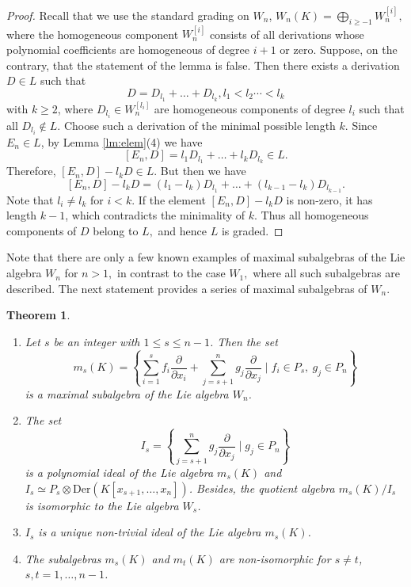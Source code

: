 \documentclass[12pt,a4paper]{amsart}
\theoremstyle{plain}
\newtheorem{theorem}{Theorem}
\theoremstyle{definition}
\begin{document}
\begin{proof}
	Recall that we use the  standard grading on $W_n$, $W_n(K) = \bigoplus_{i \ge -1} W_n^{[i]},$ where the homogeneous component  $W_n^{[i]}$ consists of all derivations whose polynomial coefficients are homogeneous  of degree $i+1$ or zero.
	Suppose, on the contrary, that the statement of the lemma is false. Then there exists a derivation $D \in L$ such that 
	$$D = D_{l_1} + \dots + D_{l_k}, l_1<l_2\cdots <l_k$$
	 with $k \ge 2$, where $D_{l_i} \in W_n^{[l_i]}$ are homogeneous components of degree $l_i$ such that all $D_{l_i}\not \in L.$ 
	Choose such a derivation of  the minimal possible length $k$.
	Since $E_n \in L$, by Lemma \ref{lm:elem}(4) we have  
	$$[E_n, D] = l_1 D_{l_1} + \dots + l_k D_{l_k} \in L.$$
	Therefore, $[E_n, D] - l_k D \in L.$ 	But then we have 
	\[
	[E_n, D] - l_k D = (l_1 - l_k)D_{l_1} + \dots + (l_{k-1} - l_k)D_{l_{k-1}}.
	\]
	Note that $l_i \neq l_k$ for $i < k$. If the element $ [E_n, D] - l_k D $  is non-zero, it has length $k-1$, which contradicts the minimality of  $k.$ 
	Thus all homogeneous components of $D$  belong to $L,$ and hence $L$ is graded. 
\end{proof}
Note that there are only a few known examples of maximal subalgebras of the  Lie algebra $W_n$ for $n>1,$ in contrast to the case $W_1,$ where all such subalgebras are described.  The next statement provides a series of maximal subalgebras of $W_n$.
	\begin{theorem}\label{th_1}
	\quad
\begin{enumerate}
	\item
	Let $s$ be an integer with $1\le s\le n-1$.
	Then the set
	\[
	m_s(K)=\left\{
	\sum_{i=1}^s f_i\frac{\partial}{\partial x_i}
	+\sum_{j=s+1}^n g_j\frac{\partial}{\partial x_j}
	\mid f_i\in P_s,\ g_j\in P_n
	\right\}
	\]
	is a maximal subalgebra of the Lie algebra $W_n$.
	
	\item
	The set
	\[
	I_s=\left\{\sum_{j=s+1}^n g_j\frac{\partial}{\partial x_j}\mid g_j\in P_n\right\}
	\]
	is a polynomial ideal of the Lie algebra $m_s(K)$ and
	$I_s\simeq P_s\otimes \mathrm{Der}(K[x_{s+1},\ldots,x_n])$.
	Besides, the quotient algebra $m_s(K)/I_s$ is isomorphic to the Lie algebra $W_s$.
	
	\item $I_s$ is a unique non-trivial ideal of the Lie algebra  $m_s(K)$.
	
	\item
	The subalgebras $m_s(K)$ and $m_t(K)$ are non-isomorphic for $s\ne t$,
	$s,t=1,\ldots,n-1$.
\end{enumerate}\end{theorem}
\end{document}
